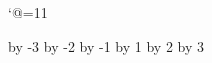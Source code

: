 
%
\catcode`@=11
\newcount\tagnumber{}

\immediate\newwrite\eqnfile
\newif\if@qnfile\@qnfilefalse
\def\write@qn#1{}
\def\writenew@qn#1{}
\def\w@rnwrite#1{\write@qn{#1}\message{#1}}
\def\@rrwrite#1{\write@qn{#1}\errmessage{#1}}

\def\taghead#1{\gdef\t@ghead{#1}\global\tagnumber=0}
\def\t@ghead{}

\expandafter\def\csname @qnnum-3\endcsname
  {{\t@ghead\advance\tagnumber by -3\relax\number\tagnumber}}
\expandafter\def\csname @qnnum-2\endcsname
  {{\t@ghead\advance\tagnumber by -2\relax\number\tagnumber}}
\expandafter\def\csname @qnnum-1\endcsname
  {{\t@ghead\advance\tagnumber by -1\relax\number\tagnumber}}
\expandafter\def\csname @qnnum0\endcsname
  {\t@ghead\number\tagnumber}
\expandafter\def\csname @qnnum+1\endcsname
  {{\t@ghead\advance\tagnumber by 1\relax\number\tagnumber}}
\expandafter\def\csname @qnnum+2\endcsname
  {{\t@ghead\advance\tagnumber by 2\relax\number\tagnumber}}
\expandafter\def\csname @qnnum+3\endcsname
  {{\t@ghead\advance\tagnumber by 3\relax\number\tagnumber}}


